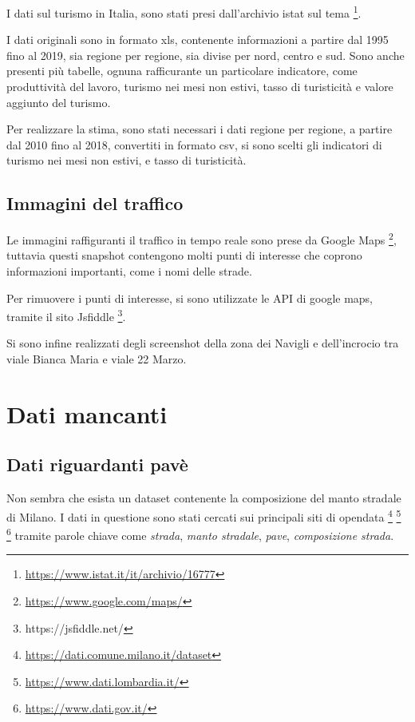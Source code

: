 \documentclass[a4paper]{report}
\begin{document}
I dati sul turismo in Italia, sono stati presi dall'archivio istat sul tema
\footnote{\url{https://www.istat.it/it/archivio/16777}}.

I dati originali sono in formato xls, contenente informazioni a partire dal 1995 fino al 2019, 
sia regione per regione, sia divise per nord, centro e sud.
Sono anche presenti più tabelle, ognuna rafficurante un particolare indicatore, 
come produttività del lavoro, turismo nei mesi non estivi, tasso di turisticità e valore aggiunto del turismo.

Per realizzare la stima, sono stati necessari i dati regione per regione, 
a partire dal 2010 fino al 2018, convertiti in formato csv, si sono scelti gli indicatori di 
turismo nei mesi non estivi, e tasso di turisticità. 

\subsection{Immagini del traffico}

Le immagini raffiguranti il traffico in tempo reale sono prese da Google Maps
\footnote{\url{https://www.google.com/maps/}}, 
tuttavia questi snapshot contengono molti punti di interesse che coprono informazioni importanti, 
come i nomi delle strade.

Per rimuovere i punti di interesse, si sono utilizzate le API di google maps, 
tramite il sito Jsfiddle
\footnote{https://jsfiddle.net/}.

Si sono infine realizzati degli screenshot della zona dei Navigli e dell'incrocio tra viale 
Bianca Maria e viale 22 Marzo.

\section{Dati mancanti}

\subsection{Dati riguardanti pavè}
Non sembra che esista un dataset contenente la composizione del manto stradale di Milano.
I dati in questione sono stati cercati sui principali siti di opendata
\footnote{\url{https://dati.comune.milano.it/dataset}}
\footnote{\url{https://www.dati.lombardia.it/}}
\footnote{\url{https://www.dati.gov.it/}}
tramite parole chiave come \textit{strada}, \textit{manto stradale}, \textit{pave}, 
\textit{composizione strada}.
\end{document}
